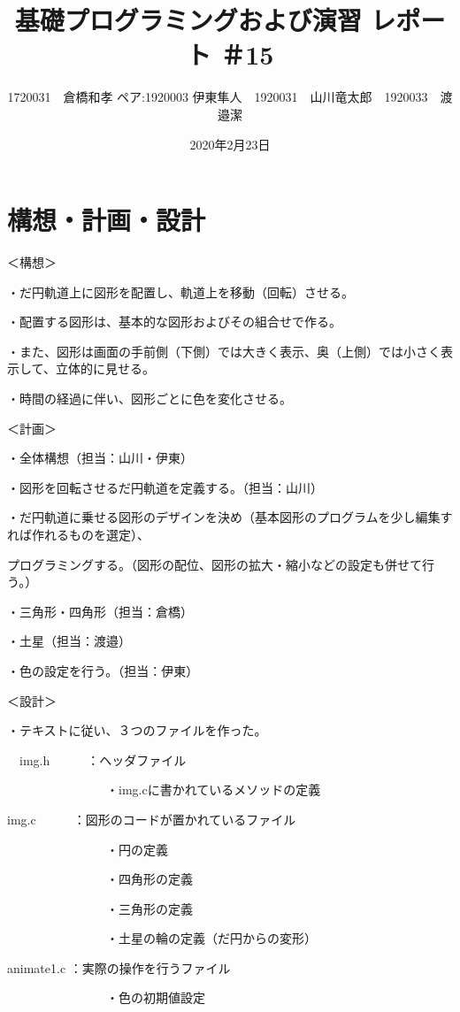 \documentclass[12pt,a4j]{jarticle}
\begin{document}
\title{基礎プログラミングおよび演習 レポート ＃15}
\author{1720031　倉橋和孝 ペア:1920003 伊東隼人　1920031　山川竜太郎　1920033　渡邉潔}
\date{2020年2月23日}
\maketitle

\section{構想・計画・設計}

＜構想＞

・だ円軌道上に図形を配置し、軌道上を移動（回転）させる。

・配置する図形は、基本的な図形およびその組合せで作る。

・また、図形は画面の手前側（下側）では大きく表示、奥（上側）では小さく表示して、立体的に見せる。

・時間の経過に伴い、図形ごとに色を変化させる。

＜計画＞

・全体構想（担当：山川・伊東）

・図形を回転させるだ円軌道を定義する。（担当：山川）

・だ円軌道に乗せる図形のデザインを決め（基本図形のプログラムを少し編集すれば作れるものを選定）、

 プログラミングする。（図形の配位、図形の拡大・縮小などの設定も併せて行う。）
 
    ・三角形・四角形（担当：倉橋）
    
    ・土星（担当：渡邉）
    
・色の設定を行う。（担当：伊東）

＜設計＞

・テキストに従い、３つのファイルを作った。

　img.h　　　：ヘッダファイル
 
　　　　　　　　・img.cに書かれているメソッドの定義
        
  img.c　　　：図形のコードが置かれているファイル
  
　　　　　　　　・円の定義
        
　　　　　　　　・四角形の定義
        
　　　　　　　　・三角形の定義
        
　　　　　　　　・土星の輪の定義（だ円からの変形）
        
  animate1.c ：実際の操作を行うファイル
  
　　　　　　　　・色の初期値設定
        
\end{document}
